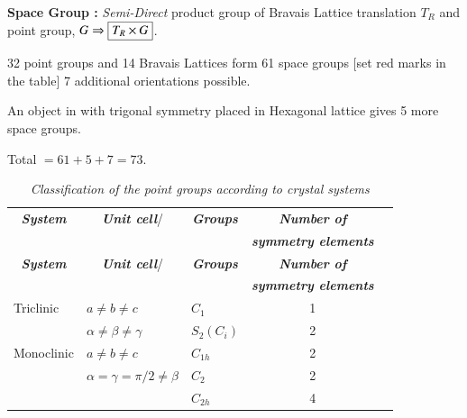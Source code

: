 \noindent
{\bf Space Group :} {\em Semi-Direct} product group of Bravais Lattice translation $T_{R}$ and point group, $G\Rightarrow \fbox{$T_{R}\times G$}$.

32 point groups and 14 Bravais Lattices form 61 space groups [set red marks in the table] 7 additional orientations possible.

An object in with trigonal symmetry placed in Hexagonal lattice gives 5 more space groups.

Total $=61+5+7=73$.
\begin{landscape}
{\small
\renewcommand{\arraystretch}{1.05}
\begin{longtable}{l|l|l|c|l}
\captionsetup{justification=centering}
\caption{\em Classification of the point groups according to crystal systems}\\
\hline
\multicolumn{1}{c|}{{\bf\em System}} & \multicolumn{1}{c|}{{\it\bfseries Unit cell}/} & \multicolumn{1}{c|}{{\it\bfseries Groups}} & \multicolumn{1}{c|}{{\it\bfseries Number of}} & \multicolumn{1}{c}{{\color{red}{\it\bfseries No. of}}}\\
\multicolumn{1}{c|}{{\color{red}{\it\bfseries additional orientations}}} & \multicolumn{1}{c|}{{\color{red}{\it\bfseries Bravais Lattice}}} & & \multicolumn{1}{c|}{{\it\bfseries symmetry elements}} & \multicolumn{1}{c}{{\color{red}{\it\bfseries same group}}}\\
\hline
\endfirsthead
\hline
\multicolumn{1}{c|}{{\bf\em System}} & \multicolumn{1}{c|}{{\it\bfseries Unit cell}/} & \multicolumn{1}{c|}{{\it\bfseries Groups}} & \multicolumn{1}{c|}{{\it\bfseries Number of}} & \multicolumn{1}{c}{{\color{red}{\it\bfseries No. of}}}\\
\multicolumn{1}{c|}{{\color{red}{\it\bfseries additional orientations}}} & \multicolumn{1}{c|}{{\color{red}{\it\bfseries Bravais Lattice}}} & & \multicolumn{1}{c|}{{\it\bfseries symmetry elements}} & \multicolumn{1}{c}{{\color{red}{\it\bfseries same group}}}\\
\hline
\endhead
\hline
\endfoot
\endlastfoot
Triclinic & $a\neq b\neq c$\qquad \color{red}{1} & $C_{1}$ & 1 & \color{red}{$2\times 1=2$}\\
          & $\alpha\neq \beta\neq \gamma$ & $S_{2}(C_{i})$ & 2 & \\
\hline
Monoclinic & $a\neq b\neq c$ & $C_{1h}$ & 2 & \color{red}{$3\times 2=6$}\\
           & $\alpha=\gamma=\pi/2\neq\beta$\qquad \color{red}{2} & $C_{2}$ & 2 & \\
           & & $C_{2h}$ & 4 & \\

\end{longtable}}
\end{landscape}
